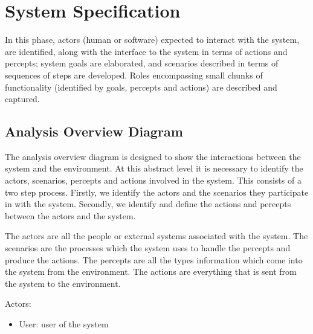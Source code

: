 \documentclass[a4paper]{article}
\begin{document}
\section{System Specification}\label{sec:sysspec} 

In this phase, actors (human or software) expected to interact with the system, are identified, along with the interface to the system in terms of actions and percepts; system goals are elaborated, and scenarios described in terms of sequences of steps are developed. Roles encompassing small chunks of functionality (identified by goals, percepts and actions) are described and captured.

\subsection{Analysis Overview Diagram}

The analysis overview diagram is designed to show the interactions between the system and the environment. At this abstract level it is necessary to identify the actors, scenarios, percepts and actions involved in the system. This consists of a two step process. Firstly, we identify the actors and the scenarios they participate in with the system. Secondly, we identify and define the actions and percepts between the actors and the system.

The actors are all the people or external systems associated with the system. The scenarios are the processes which the system uses to handle the percepts and produce the actions. The percepts are all the types information which come into the system from the environment. The actions are everything that is sent from the system to the environment.


Actors:
\begin{itemize}
  \item User: user of the system
\end{itemize}
\end{document}
